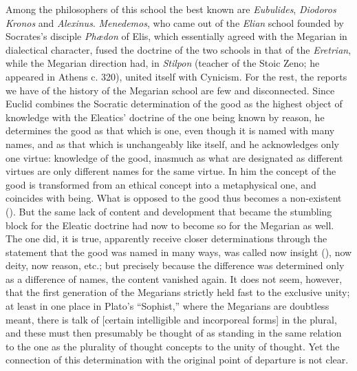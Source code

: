 Among the philosophers of this school the best known are \emph{Eubulides}, \emph{Diodoros Kronos} and \emph{Alexinus}. \emph{Menedemos}, who came out of the \emph{Elian} school founded by Socrates's disciple \emph{Phædon} of Elis, which essentially agreed with the Megarian in dialectical character, fused the doctrine of the two schools in that of the \emph{Eretrian}, while the Megarian direction had, in \emph{Stilpon} (teacher of the Stoic Zeno; he appeared in Athens c. 320), united itself with Cynicism. For the rest, the reports we have of the history of the Megarian school are few and disconnected.
Since Euclid combines the Socratic determination of the good as the highest object of knowledge with the Eleatics' doctrine of the one being known by reason, he determines the good as that which is one, even though it is named with many names, and as that which is unchangeably like itself, and he acknowledges only one virtue: knowledge of the good, inasmuch as what are designated as different virtues are only different names for the same virtue. In him the concept of the good is transformed from an ethical concept into a metaphysical one, and coincides with being. What is opposed to the good thus becomes a non-existent (). But the same lack of content and development that became the stumbling block for the Eleatic doctrine had now to become so for the Megarian as well. The one did, it is true, apparently receive closer determinations through the statement that the good was named in many ways, was called now insight (), now deity, now reason, etc.; but precisely because the difference was determined only as a difference of names, the content vanished again. It does not seem, however, that the first generation of the Megarians strictly held fast to the exclusive unity; at least in one place in Plato's ``Sophist,'' where the Megarians are doubtless meant, there is talk of  [certain intelligible and incorporeal forms] in the plural, and these must then presumably be thought of as standing in the same relation to the one as the plurality of thought concepts to the unity of thought. Yet the connection of this determination with the original point of departure is not clear.

